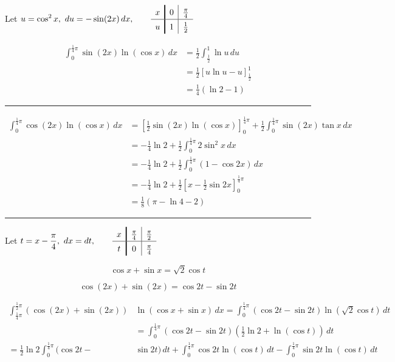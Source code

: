 \documentclass[12pt]{article}
\begin{document}
\newcommand{\ds}{\displaystyle}

Let $\ds u=\cos^2x,\ du=-\sin(2x)\,dx,\qquad
\renewcommand{\arraystretch}{1.4}
\begin{array}{c!{\vrule width 1.2pt}c|c}
x & 0 & \frac{\pi}{4}\\
\hline
\rule[-4pt]{0pt}{14pt}
u & 1 & \frac12
\end{array}
$

\begin{align*}
\int_0^{\frac14\pi}\sin(2x)\ln(\cos x)\,dx
&=\frac12\int_{\frac12}^{1}\ln u\,du\\
&=\frac12[u\ln u-u]_{\frac12}^{1}\\
&=\frac14(\ln2-1)
\end{align*}

\bigskip\hrule\bigskip

\begin{align*}
\int_0^{\frac14\pi}\cos(2x)\ln(\cos x)\,dx
&=\left[\frac12\sin(2x)\ln(\cos x)\right]_0^{\frac14\pi}
+\frac12\int_0^{\frac14\pi}\sin(2x)\tan x\,dx\\
&=-\frac14\ln2+\frac12\int_0^{\frac14\pi}2\sin^2x\,dx\\
&=-\frac14\ln2+\frac12\int_0^{\frac14\pi}(1-\cos2x)\,dx\\
&=-\frac14\ln2+\frac12\left[x-\frac12\sin2x\right]_0^{\frac14\pi}\\
&=\frac18(\pi-\ln4-2)
\end{align*}

\bigskip\hrule\bigskip

Let $\ds t=x-\frac{\pi}{4},\ dx=dt, \qquad
\renewcommand{\arraystretch}{1.4}
\begin{array}{c!{\vrule width 1.2pt}c|c}
x & \frac{\pi}{4} & \frac{\pi}{2}\\
\hline
\rule[-4pt]{0pt}{14pt}
t & 0 & \frac{\pi}{4}
\end{array}
$

$$\cos x+\sin x=\sqrt2\cos t$$

$$\cos(2x)+\sin(2x)=\cos2t-\sin2t$$

\begin{align*}
\int_{\frac14\pi}^{\frac12\pi}(\cos(2x)+\sin(2x))&\ln(\cos x+\sin x)\,dx=\int_0^{\frac14\pi}(\cos2t-\sin2t)\ln(\sqrt2\cos t)\,dt\\
&=\int_0^{\frac14\pi}(\cos2t-\sin2t)\left(\frac12\ln2+\ln(\cos t)\right)\,dt\\
=\frac12\ln2\int_0^{\frac14\pi}(\cos2t-&\sin2t)\,dt+\int_0^{\frac14\pi}\cos2t\ln(\cos t)\,dt-\int_0^{\frac14\pi}\sin2t\ln(\cos t)\,dt
\end{align*}
\end{document}
